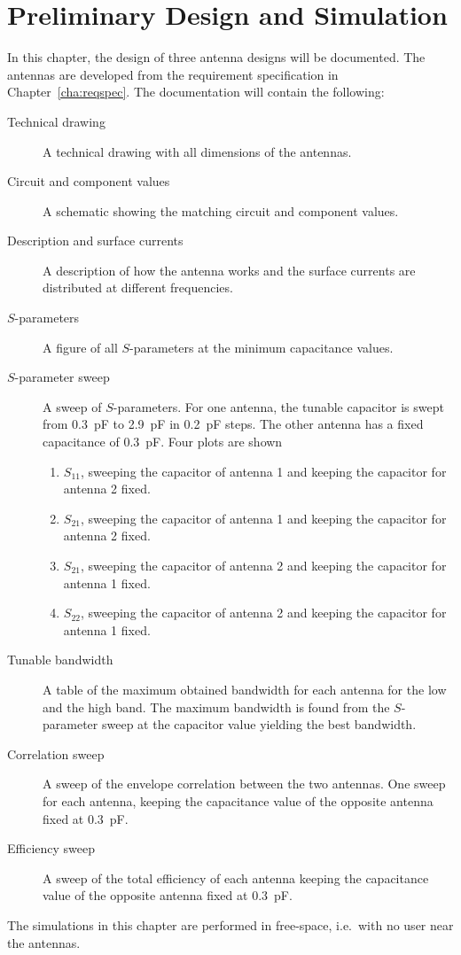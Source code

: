 \chapter{Preliminary Design and Simulation}
\label{cha:nousersim}
In this chapter, the design of three antenna designs will be documented. The antennas are developed from the requirement specification in Chapter~\ref{cha:reqspec}. The documentation will contain the following:
\begin{description}
\item[Technical drawing] A technical drawing with all dimensions of the antennas. 
\item[Circuit and component values] A schematic showing the matching circuit and component values.
\item[Description and surface currents] A description of how the antenna works and the surface currents are distributed at different frequencies.
\item[$S$-parameters] A figure of all $S$-parameters at the minimum capacitance values.
\item[$S$-parameter sweep] A sweep of $S$-parameters. For one antenna, the tunable capacitor is swept from \SI{0.3}{pF} to \SI{2.9}{pF} in \SI{0.2}{pF} steps. The other antenna has a fixed capacitance of \SI{0.3}{pF}. Four plots are shown
    \begin{enumerate}
    \item $S_{11}$, sweeping the capacitor of antenna 1 and keeping the capacitor for antenna 2 fixed.
    \item $S_{21}$, sweeping the capacitor of antenna 1 and keeping the capacitor for antenna 2 fixed.
    \item $S_{21}$, sweeping the capacitor of antenna 2 and keeping the capacitor for antenna 1 fixed.
    \item $S_{22}$, sweeping the capacitor of antenna 2 and keeping the capacitor for antenna 1 fixed.
    \end{enumerate}
\item[Tunable bandwidth] A table of the maximum obtained bandwidth for each antenna for the low and the high band. The maximum bandwidth is found from the $S$-parameter sweep at the capacitor value yielding the best bandwidth.
\item[Correlation sweep] A sweep of the envelope correlation between the two antennas. One sweep for each antenna, keeping the capacitance value of the opposite antenna fixed at \SI{0.3}{pF}.
\item[Efficiency sweep] A sweep of the total efficiency of each antenna keeping the capacitance value of the opposite antenna fixed at \SI{0.3}{pF}.
\end{description}

The simulations in this chapter are performed in free-space, i.e.\ with no user near the antennas.
